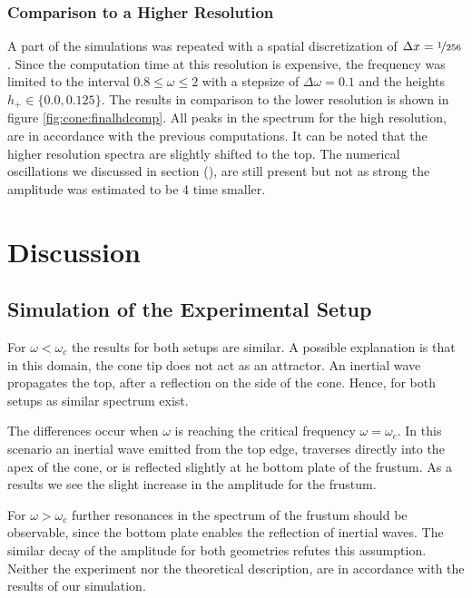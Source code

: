 \subsubsection{Comparison to a Higher Resolution}

A part of the simulations was repeated with a spatial discretization of $\Delta x= \nicefrac{1}{256}$.
Since the computation time at this resolution is expensive, the frequency was limited
to the interval $0.8\leq\omega\leq2$ with a stepsize of $\Delta \omega = 0.1$ and the heights
$h_+\in\{0.0, 0.125\}$.
The results in comparison to the lower resolution is shown in figure \ref{fig:cone:finalhdcomp}.
All peaks in the spectrum for the high resolution, are in accordance with the previous computations.
It can be noted that the higher resolution spectra are slightly shifted to the top.
The numerical oscillations we discussed in section (), are still present but not as strong
the amplitude was estimated to be 4 time smaller.




\clearpage

\section{Discussion}
\subsection{Simulation of the Experimental Setup}

For $\omega < \omega_c$ the results for both setups are similar.
A possible explanation is that in this domain, the cone tip does not act as an attractor.
An inertial wave propagates the top, after a reflection on the side of the cone.
Hence, for both setups as similar spectrum exist.

The differences occur when $\omega$ is reaching the critical frequency $\omega = \omega_c$. In this scenario an inertial wave emitted from the
top edge, traverses directly into the apex of the cone, or is reflected slightly at he bottom plate of the frustum.
As a results we see the slight increase in the amplitude for the frustum.

For $\omega > \omega_c$ further resonances in the spectrum of the frustum should be observable,
since the bottom plate enables the reflection of inertial waves.
The similar decay of the amplitude for both geometries refutes this assumption.
Neither the experiment nor the theoretical description, are in accordance with the results of our simulation.

